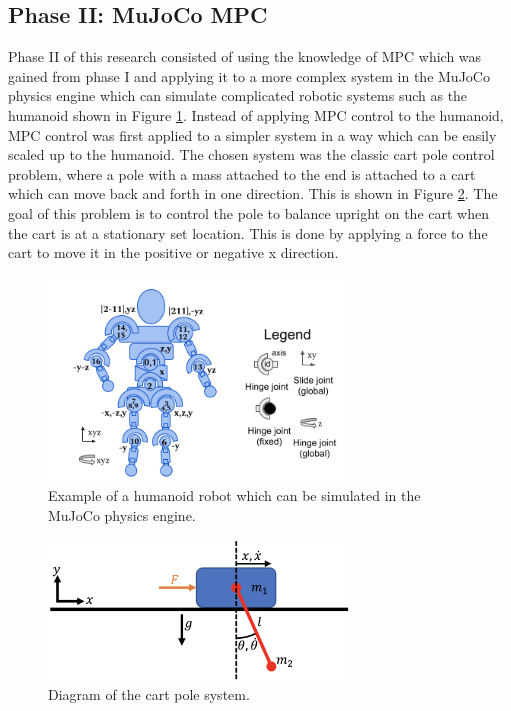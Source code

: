 \documentclass{./springer/svjour3}
\begin{document}
\subsection{Phase II: MuJoCo MPC}
Phase II of this research consisted of using the knowledge of MPC which was gained from phase I and applying it to a more complex system in the MuJoCo physics engine which can 
simulate complicated robotic systems such as the humanoid shown in Figure \ref{fig:humanoid}. Instead of applying MPC control to the humanoid, MPC control was first applied to a simpler system 
in a way which can be easily scaled up to the humanoid. The chosen system was the classic cart pole control problem, where a pole with a 
mass attached to the end is attached to a cart which can move back and forth in one direction. This is shown in Figure \ref{fig:cartpole}. The goal of this problem is to 
control the pole to balance upright on the cart when the cart is at a stationary set location. This is done by applying a force to the cart to move it in the positive or 
negative x direction.

\begin{figure}[!h]
  \centering
  \includegraphics[width=8cm]{./figures/humanoid.png}
  \caption{Example of a humanoid robot which can be simulated in the MuJoCo physics engine.}
  \label{fig:humanoid} 
\end{figure}

\begin{figure}[!h]
  \centering
  \includegraphics[width=8cm]{./figures/cartpole-dynamics.png}
  \caption{Diagram of the cart pole system.}
  \label{fig:cartpole} 
\end{figure}
\end{document}
